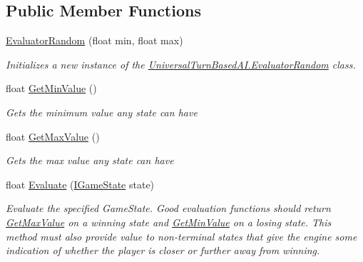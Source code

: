 \subsection*{Public Member Functions}
\begin{DoxyCompactItemize}
\item 
\hyperlink{class_universal_turn_based_a_i_1_1_evaluator_random_a3914def8b2e2bb2f6a264a6762b84063}{Evaluator\+Random} (float min, float max)
\begin{DoxyCompactList}\small\item\em Initializes a new instance of the \hyperlink{class_universal_turn_based_a_i_1_1_evaluator_random}{Universal\+Turn\+Based\+A\+I.\+Evaluator\+Random} class. \end{DoxyCompactList}\item 
float \hyperlink{class_universal_turn_based_a_i_1_1_evaluator_random_aa00a794e5d3a65a8a7aded74889b5db1}{Get\+Min\+Value} ()
\begin{DoxyCompactList}\small\item\em Gets the minimum value any state can have \end{DoxyCompactList}\item 
float \hyperlink{class_universal_turn_based_a_i_1_1_evaluator_random_a1076a840c9149590bd3b412c293d9d58}{Get\+Max\+Value} ()
\begin{DoxyCompactList}\small\item\em Gets the max value any state can have \end{DoxyCompactList}\item 
float \hyperlink{class_universal_turn_based_a_i_1_1_evaluator_random_a644da297c62c82415890085bb3976dce}{Evaluate} (\hyperlink{interface_universal_turn_based_a_i_1_1_i_game_state}{I\+Game\+State} state)
\begin{DoxyCompactList}\small\item\em Evaluate the specified Game\+State. Good evaluation functions should return \hyperlink{class_universal_turn_based_a_i_1_1_evaluator_random_a1076a840c9149590bd3b412c293d9d58}{Get\+Max\+Value} on a winning state and \hyperlink{class_universal_turn_based_a_i_1_1_evaluator_random_aa00a794e5d3a65a8a7aded74889b5db1}{Get\+Min\+Value} on a losing state. This method must also provide value to non-\/terminal states that give the engine some indication of whether the player is closer or further away from winning. \end{DoxyCompactList}\end{DoxyCompactItemize}


